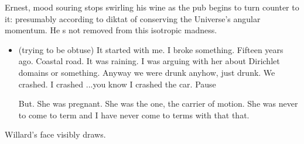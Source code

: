 Ernest, mood souring stops swirling his wine as the pub begins to turn counter to it: presumably according to diktat of conserving the Universe's angular momentum. He s not removed from this isotropic madness. 
\begin{itemize}[leftmargin=2cm, label={}]

\item[\textbf{Ernest:}] (trying to be obtuse) It started with me. I broke something. Fifteen years ago. Coastal road. It was raining. I was arguing with her about Dirichlet domains or something. Anyway we were drunk anyhow, just drunk. We crashed. I crashed ...you know I crashed the car.  Pause

But. She was pregnant.
She was the one, the carrier of motion. She was never to come to term and I have never come to terms with that that.
\end{itemize}

Willard’s face visibly draws.

